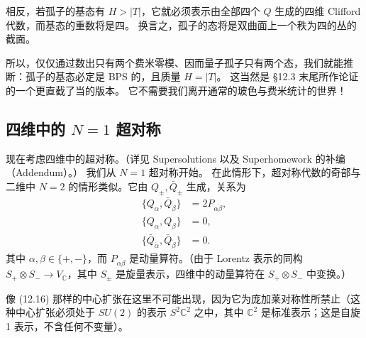相反，若孤子的基态有 $H>|T|$，它就必须表示由全部四个 $Q$ 生成的四维 Clifford 代数，而基态的重数将是四。
换言之，孤子的态将是双曲面上一个秩为四的丛的截面。

所以，仅仅通过数出只有两个费米零模、因而量子孤子只有两个态，我们就能推断：孤子的基态必定是 BPS 的，且质量 $H=|T|$。
这当然是 §12.3 末尾所作论证的一个更直截了当的版本。
它不需要我们离开通常的玻色与费米统计的世界！

\subsection{四维中的 $N=1$ 超对称}

现在考虑四维中的超对称。（详见 Supersolutions 以及 Superhomework 的补编（Addendum）。）
我们从 $N=1$ 超对称开始。
在此情形下，超对称代数的奇部与二维中 $N=2$ 的情形类似。它由 $Q_\pm,\bar Q_\pm$ 生成，关系为
\begin{equation}
  \tag{12.22}
  \label{eq:12-22}
  \begin{aligned}
    \{Q_\alpha,\bar Q_{\dot\beta}\}&=2P_{\alpha\dot\beta},\\
    \{Q_\alpha,Q_\beta\}&=0,\\
    \{\bar Q_{\dot\alpha},\bar Q_{\dot\beta}\}&=0.
  \end{aligned}
\end{equation}
其中 $\alpha,\beta\in\{+,-\}$，而 $P_{\alpha\dot\beta}$ 是动量算符。（由于 Lorentz 表示的同构 $S_+\otimes S_-\to V_{\mathbb{C}}$，其中 $S_\pm$ 是旋量表示，四维中的动量算符在 $S_+\otimes S_-$ 中变换。）


像 (12.16) 那样的中心扩张在这里不可能出现，因为它为庞加莱对称性所禁止（这种中心扩张必须处于 $SU(2)$ 的表示 $S^2\mathbb{C}^2$ 之中，其中 $\mathbb{C}^2$ 是标准表示；这是自旋 1 表示，不含任何不变量）。


